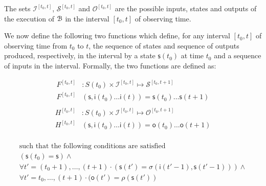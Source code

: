 The sets $\mathcal{I}^{[t_0,t]}$, $\mathcal{S}^{[t_0,t]}$ and $\mathcal{O}^{[t_0,t]}$ are the possible inputs, states and outputs of the execution of ${\mathcal{B}}$ in the interval $[t_0,t]$ of observing time. 

		We now define the following two functions which define,  for any interval $[t_0,t]$ of observing time from $t_0$ to $t$,  the sequence of states and sequence of outputs produced, respectively,  in the interval by a state $\mathsf{s}(t_0)$ at time $t_0$ and a sequence of inputs in the interval. Formally, the two functions are defined as:


\begin{equation}
\begin{split}
F^{[t_0,t]}&: S(t_0)\times \mathcal{I}^{[t_0,t]} \mapsto \mathcal{S}^{[t_0,t+1]}\\
F^{[t_0,t]}&(\mathsf{s}, \mathsf{i}(t_0)\ldots \mathsf{i}(t))= \mathsf{s}(t_0)\ldots \mathsf{s}(t+1)\\
 \end{split}
\end{equation}
 \begin{equation}
\begin{split}
 H^{[t_0,t]}&: S(t_0)\times \mathcal{I}^{[t_0,t]} \mapsto \mathcal{O}^{[t_0,t+1]}\\
H^{[t_0,t]}&(\mathsf{s}, \mathsf{i}(t_0)\ldots \mathsf{i}(t))= \mathsf{o}(t_0)\ldots \mathsf{o}(t+1)\\
\end{split}
\end{equation}

\[
\begin{array}{llllll}
\mbox{such that the following conditions are satisfied}\\
 (\mathsf{s}(t_0)=\mathsf{s})\wedge \\
 \forall t'=(t_0+1),\ldots,(t+1)\cdot (\mathsf{s}(t')=\sigma(\mathsf{i}(t'-1),\mathsf{s}(t'-1)))\wedge \\
 \forall t'=t_0,\ldots,(t+1)\cdot (\mathsf{o}(t')=\rho(\mathsf{s}(t'))
\end{array}
\]

